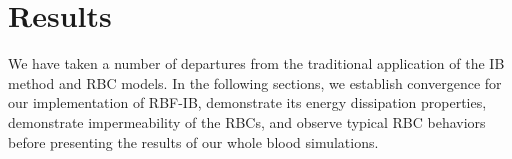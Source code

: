 \section{Results}\label{sec:results}

We have taken a number of departures from the traditional application of the IB method and RBC models. In the
following sections, we establish convergence for our implementation of RBF-IB, demonstrate its energy dissipation properties, demonstrate impermeability of the
RBCs, and observe typical RBC behaviors before presenting the results of our whole blood simulations.






